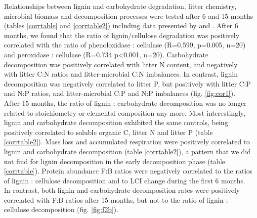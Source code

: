 Relationships between lignin and carbohydrate degradation, litter chemistry, microbial biomass and decomposition processes were tested after 6 and 15 months (tables \ref{corrtable} and \ref{corrtable2}) including data presented by \cite{Mooshammer2011} and \cite{Leitner2011}. After 6 months, we found that the ratio of lignin/cellulose degradation was positively correlated with the ratio of phenoloxidase : cellulase (R=0.599, p=0.005, n=20) and peroxidase : cellulase (R=0.734 p\textless 0.001, n=20). Carbohydrate decomposition was positively correlated with litter N content, and negatively with litter C:N ratios and litter-microbial C:N imbalances. In contrast, lignin decomposition was negatively correlated to litter P, but positively with litter C:P and N:P ratios, and litter-microbial C:P and N:P imbalances (fig. \ref{fig:cor1}). After 15 months, the ratio of lignin : carbohydrate decomposition was no longer related to stoichiometry or elemental composition any more. Most interestingly, lignin and carbohydrate decomposition exhibited the same controls, being positively correlated to soluble organic C, litter N and litter P (table \ref{corrtable2}). Mass loss and accumulated respiration were positively correlated to lignin and carbohydrate decomposition (table \ref{corrtable2}), a pattern that we did not find for lignin decomposition in the early decomposition phase (table \ref{corrtable}). Protein abundance F:B ratios were negatively correlated to the ratios of lignin : cellulose decomposition and to LCI change during the first 6 months. In contrast, both lignin and carbohydrate decomposition rates were positively correlated with F:B ratios after 15 months, but not to the ratio of lignin : cellulose decomposition (fig. \ref{fig:f2b}).


